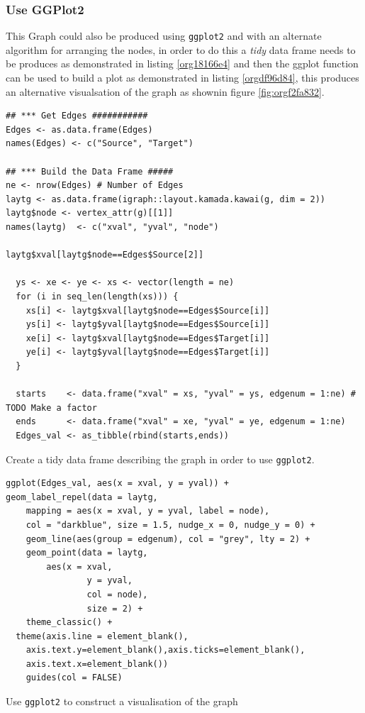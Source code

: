 \documentclass[11pt]{article}
\begin{document}
\subsubsection{Use GGPlot2}
\label{sec:org4857c22}
This Graph could also be produced using \texttt{ggplot2} and with an alternate algorithm for arranging the nodes, in order to do this a \emph{tidy} data frame needs to be produces as demonstrated in listing \ref{org18166e4} and then the ggplot function can be used to build a plot as demonstrated in listing \ref{orgdf96d84}, this produces an alternative visualsation of the graph as shownin figure \ref{fig:orgf2fa832}.

\begin{listing}[htbp]
\begin{verbatim}
## *** Get Edges ###########
Edges <- as.data.frame(Edges)
names(Edges) <- c("Source", "Target")

## *** Build the Data Frame #####
ne <- nrow(Edges) # Number of Edges
laytg <- as.data.frame(igraph::layout.kamada.kawai(g, dim = 2))
laytg$node <- vertex_attr(g)[[1]]
names(laytg)  <- c("xval", "yval", "node")

laytg$xval[laytg$node==Edges$Source[2]]

  ys <- xe <- ye <- xs <- vector(length = ne)
  for (i in seq_len(length(xs))) {
    xs[i] <- laytg$xval[laytg$node==Edges$Source[i]]
    ys[i] <- laytg$yval[laytg$node==Edges$Source[i]]
    xe[i] <- laytg$xval[laytg$node==Edges$Target[i]]
    ye[i] <- laytg$yval[laytg$node==Edges$Target[i]]
  }

  starts    <- data.frame("xval" = xs, "yval" = ys, edgenum = 1:ne) # TODO Make a factor
  ends      <- data.frame("xval" = xe, "yval" = ye, edgenum = 1:ne)
  Edges_val <- as_tibble(rbind(starts,ends))
\end{verbatim}
\caption{\label{org18166e4}Create a tidy data frame describing the graph in order to use \texttt{ggplot2}.}
\end{listing}

\begin{listing}[htbp]
\begin{verbatim}
ggplot(Edges_val, aes(x = xval, y = yval)) +
geom_label_repel(data = laytg,
    mapping = aes(x = xval, y = yval, label = node),
    col = "darkblue", size = 1.5, nudge_x = 0, nudge_y = 0) +
    geom_line(aes(group = edgenum), col = "grey", lty = 2) +
    geom_point(data = laytg,
        aes(x = xval,
                y = yval,
                col = node),
                size = 2) +
    theme_classic() +
  theme(axis.line = element_blank(),
    axis.text.y=element_blank(),axis.ticks=element_blank(),
    axis.text.x=element_blank())
    guides(col = FALSE)
\end{verbatim}
\caption{\label{orgdf96d84}Use \texttt{ggplot2} to construct a visualisation of the graph}
\end{listing}
\end{document}
